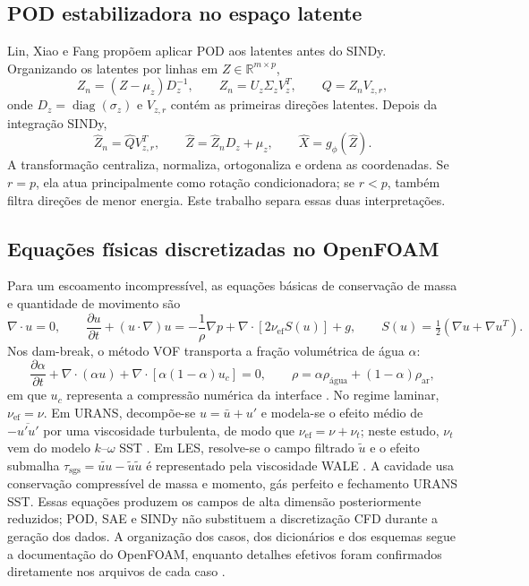\documentclass[12pt,a4paper]{article}
\begin{document}
\subsection{POD estabilizadora no espaço latente}
Lin, Xiao e Fang \cite{lin2024} propõem aplicar POD aos latentes antes do SINDy. Organizando os latentes por linhas em $Z\in\mathbb{R}^{m\times p}$,
\begin{equation}
Z_n=(Z-\mu_z)D_z^{-1},
\qquad
Z_n=U_z\Sigma_zV_z^T,
\qquad
Q=Z_nV_{z,r},
\label{eq:pod_latente}
\end{equation}
onde $D_z=\operatorname{diag}(\sigma_z)$ e $V_{z,r}$ contém as primeiras direções latentes. Depois da integração SINDy,
\begin{equation}
\widehat Z_n=\widehat QV_{z,r}^{T},
\qquad
\widehat Z=\widehat Z_nD_z+\mu_z,
\qquad
\widehat X=g_\phi(\widehat Z).
\label{eq:decodificacao_hibrida}
\end{equation}
A transformação centraliza, normaliza, ortogonaliza e ordena as coordenadas. Se $r=p$, ela atua principalmente como rotação condicionadora; se $r<p$, também filtra direções de menor energia. Este trabalho separa essas duas interpretações.

\subsection{Equações físicas discretizadas no OpenFOAM}
Para um escoamento incompressível, as equações básicas de conservação de massa e quantidade de movimento são \cite{pritchard2011,tu2008}
\begin{equation}
\nabla\!\cdot u=0,
\qquad
\frac{\partial u}{\partial t}+(u\!\cdot\!\nabla)u
=-\frac{1}{\rho}\nabla p+\nabla\!\cdot\!\left[2\nu_{\mathrm{ef}}S(u)\right]+g,
\qquad
S(u)=\tfrac12\left(\nabla u+\nabla u^T\right).
\label{eq:navier_stokes}
\end{equation}
Nos dam-break, o método VOF transporta a fração volumétrica de água $\alpha$:
\begin{equation}
\frac{\partial\alpha}{\partial t}+\nabla\!\cdot(\alpha u)
+\nabla\!\cdot\!\left[\alpha(1-\alpha)u_c\right]=0,
\qquad
\rho=\alpha\rho_{\mathrm{água}}+(1-\alpha)\rho_{\mathrm{ar}},
\label{eq:vof}
\end{equation}
em que $u_c$ representa a compressão numérica da interface \cite{hirt1981}. No regime laminar, $\nu_{\mathrm{ef}}=\nu$. Em URANS, decompõe-se $u=\bar u+u'$ e modela-se o efeito médio de $-\overline{u'u'}$ por uma viscosidade turbulenta, de modo que $\nu_{\mathrm{ef}}=\nu+\nu_t$; neste estudo, $\nu_t$ vem do modelo $k$--$\omega$ SST \cite{menter1994}. Em LES, resolve-se o campo filtrado $\widetilde u$ e o efeito submalha $\tau_{\mathrm{sgs}}=\widetilde{uu}-\widetilde u\widetilde u$ é representado pela viscosidade WALE \cite{nicoud1999}. A cavidade usa conservação compressível de massa e momento, gás perfeito e fechamento URANS SST. Essas equações produzem os campos de alta dimensão posteriormente reduzidos; POD, SAE e SINDy não substituem a discretização CFD durante a geração dos dados. A organização dos casos, dos dicionários e dos esquemas segue a documentação do OpenFOAM, enquanto detalhes efetivos foram confirmados diretamente nos arquivos de cada caso \cite{openfoam}.
\end{document}
